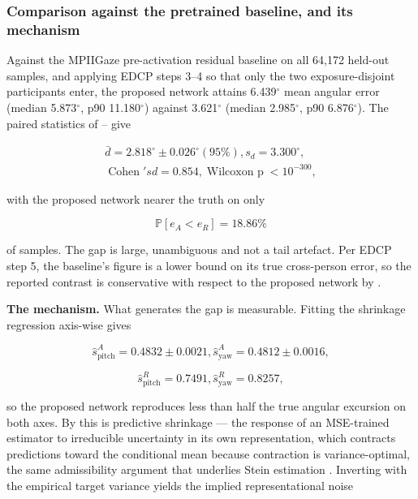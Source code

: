 \subsubsection{Comparison against the pretrained baseline, and its mechanism}

Against the MPIIGaze pre-activation residual baseline on all 64,172 held-out samples, and applying EDCP steps 3--4 so that only the two exposure-disjoint participants enter, the proposed network attains 6.439$^{\circ}$ mean angular error (median 5.873$^{\circ}$, p90 11.180$^{\circ}$) against 3.621$^{\circ}$ (median 2.985$^{\circ}$, p90 6.876$^{\circ}$). The paired statistics of -- give

\begin{equation}
\label{eq:189}
\begin{aligned}
\bar{d} = 2.818^{\circ} \pm 0.026^{\circ} (95 \%) , s_d = 3.300^{\circ} , \\
\;\text{Cohen}\;'s d = 0.854 , \;\text{Wilcoxon p}\; < 10^{-300} ,
\end{aligned}
\end{equation}

with the proposed network nearer the truth on only

\begin{equation}
\label{eq:190}
\mathbb{P}[ e_A < e_R ] = 18.86 \%
\end{equation}

of samples. The gap is large, unambiguous and not a tail artefact. Per EDCP step 5, the baseline's figure is a lower bound on its true cross-person error, so the reported contrast is conservative with respect to the proposed network by .

\textbf{The mechanism.} What generates the gap is measurable. Fitting the shrinkage regression  axis-wise gives

\begin{equation}
\label{eq:191}
\hat{s}_{\mathrm{pitch}}^A = 0.4832 \pm 0.0021 , \hat{s}_{\mathrm{yaw}}^A = 0.4812 \pm 0.0016 ,
\end{equation}

\begin{equation}
\label{eq:192}
\hat{s}_{\mathrm{pitch}}^R = 0.7491 , \hat{s}_{\mathrm{yaw}}^R = 0.8257 ,
\end{equation}

so the proposed network reproduces less than half the true angular excursion on both axes. By  this is predictive shrinkage --- the response of an MSE-trained estimator to irreducible uncertainty in its own representation, which contracts predictions toward the conditional mean because contraction is variance-optimal, the same admissibility argument that underlies Stein estimation . Inverting  with the empirical target variance yields the implied representational noise

